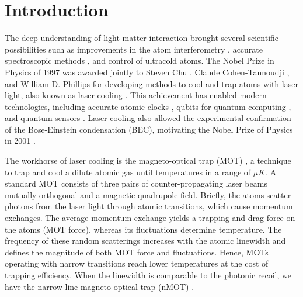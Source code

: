 %
%
\chapter{Introduction}
\label{ch:introduction}

The deep understanding of light-matter interaction brought several scientific possibilities such as improvements in the atom interferometry \cite{peters2001high}, accurate spectroscopic methods \cite{mukamel2020roadmap}, and control of ultracold atoms. 
The Nobel Prize in Physics of 1997 was awarded jointly to Steven Chu \cite{chu1998nobel}, Claude Cohen-Tannoudji \cite{cohen1998nobel}, and William D. Phillips \cite{phillips1998nobel} for developing methods to cool and trap atoms with laser light, also known as laser cooling \cite{metcalf2007laser}. This achievement has enabled modern technologies, including accurate atomic clocks \cite{ludlow2015optical}, qubits for quantum computing \cite{schneider2012quantum}, and quantum sensors \cite{zhang2016precision}. Laser cooling also allowed the experimental confirmation of the Bose-Einstein condensation (BEC), motivating the Nobel Prize of Physics in 2001 \cite{cornell2002nobel, ketterle2002nobel}.

The workhorse of laser cooling is the magneto-optical trap (MOT) \cite{krzysztof2010magneto}, a technique to trap and cool a dilute atomic gas until temperatures in a range of $\mu K$. A standard MOT consists of three pairs of counter-propagating laser beams mutually orthogonal and a magnetic quadrupole field. Briefly, the atoms scatter photons from the laser light through atomic transitions, which cause momentum exchanges. The average momentum exchange yields a trapping and drag force on the atoms (MOT force), whereas its fluctuations determine temperature. The frequency of these random scatterings increases with the atomic linewidth and defines the magnitude of both MOT force and fluctuations. Hence, MOTs operating with narrow transitions reach lower temperatures at the cost of trapping efficiency. When the linewidth is comparable to the photonic recoil, we have the narrow line magneto-optical trap (nMOT) \cite{frisch2012narrow, maier2014narrow, miyazawa2021narrow}.


